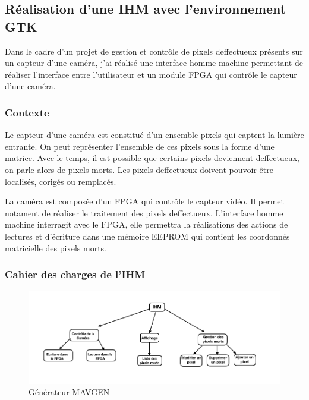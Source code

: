 \subsection{Réalisation d'une IHM avec l'environnement GTK}

Dans le cadre d'un projet de gestion et contrôle de pixels deffectueux présents sur un capteur d'une caméra, j'ai réalisé une interface homme machine permettant de réaliser l'interface entre l'utilisateur et un module FPGA qui contrôle le capteur d'une caméra. 
\\ 

\subsubsection{Contexte} 

Le capteur d'une caméra est constitué d'un ensemble pixels qui captent la lumière entrante. On peut représenter l'ensemble de ces pixels sous la forme d'une matrice. Avec le temps, il est possible que certains pixels deviennent deffectueux, on parle alors de pixels morts. Les pixels deffectueux doivent pouvoir être localisés, corigés ou remplacés.  
\newline

La caméra est composée d'un FPGA qui contrôle le capteur vidéo. Il permet notament de réaliser le traitement des pixels deffectueux. L'interface homme machine interragit avec le FPGA, elle permettra la réalisations des actions de lectures et d'écriture dans une mémoire EEPROM qui contient les coordonnés matricielle des pixels morts. 

\subsubsection{Cahier des charges de l'IHM } 

\begin{figure}[ht]
	\centering
    \includegraphics[scale=0.5]{img/cdcIHM.png}
    \caption{Générateur MAVGEN}
    \label{fig:mavgen}
\end{figure}

